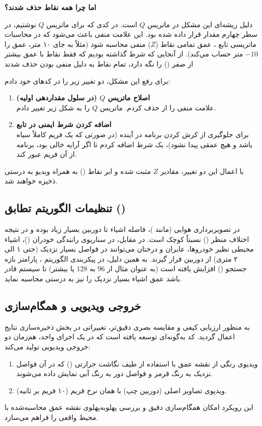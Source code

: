 \documentclass[12pt,a4paper]{article}
\begin{document}
	\textbf{اما چرا همه نقاط حذف شدند؟}
	
	دلیل ریشه‌ای این مشکل در ماتریس $Q$ است. در کدی که برای ماتریس $Q$ نوشتیم، در سطر چهارم مقدار  قرار داده شده بود. این علامت منفی باعث می‌شود که در محاسبات ماتریسی تابع ، عمق تمامی نقاط ($Z$) منفی محاسبه شود (مثلاً به جای ۱۰ متر، عمق را $-10$ متر حساب می‌کند). از آنجایی که شرط گذاشته بودیم که فقط نقاط با عمق بیشتر از صفر () را نگه دارد، تمام نقاط به دلیل منفی بودن حذف شدند
	
	برای رفع این مشکل، دو تغییر زیر را در کدهای خود دادم:
	
	\begin{enumerate}
		\item \textbf{اصلاح ماتریس $Q$ (در سلول مقداردهی اولیه)}\\
		علامت منفی را از  حذف کردم. ماتریس $Q$ را به شکل زیر تغییر دادم.
		
		\item \textbf{اضافه کردن شرط ایمنی در تابع }\\
		برای جلوگیری از کرش کردن برنامه در آینده (در صورتی که یک فریم کاملاً سیاه باشد و هیچ عمقی پیدا نشود)، یک شرط  اضافه کردم تا اگر آرایه خالی بود، برنامه از آن فریم عبور کند.
	\end{enumerate}
	
	با اعمال این دو تغییر، مقادیر $Z$ مثبت شده و ابر نقاط () به همراه ویدیو به درستی ذخیره خواهند شد.
\subsection{تنظیمات الگوریتم تطابق ()}	در تصویربرداری هوایی (مانند )، فاصله اشیاء تا دوربین بسیار زیاد بوده و در نتیجه اختلاف منظر () نسبتاً کوچک است. در مقابل، در سناریوی رانندگی خودران ()، اشیاء محیطی نظیر خودروها، عابران و درختان می‌توانند در فواصل بسیار نزدیک (حتی ۱ الی ۲ متری) از دوربین قرار گیرند. به همین دلیل، در پیکربندی الگوریتم ، پارامتر بازه جستجو () افزایش یافته است (به عنوان مثال از $96$ به $128$ یا بیشتر) تا سیستم قادر باشد عمق اشیاء بسیار نزدیک را نیز به درستی محاسبه نماید.
	
\subsection{خروجی ویدیویی و همگام‌سازی}	به منظور ارزیابی کیفی و مقایسه بصری دقیق‌تر، تغییراتی در بخش ذخیره‌سازی نتایج اعمال گردید. کد به‌گونه‌ای توسعه یافته است که در یک اجرای واحد، هم‌زمان دو خروجی ویدیویی تولید می‌کند: 
	\begin{enumerate}
	\item ویدیوی رنگی از نقشه عمق با استفاده از طیف نگاشت حرارتی () که در آن فواصل نزدیک به رنگ قرمز و فواصل دور به رنگ آبی نمایش داده می‌شوند.
	\item ویدیوی تصاویر اصلی (دوربین چپ) با همان نرخ فریم (۱۰ فریم بر ثانیه).
\end{enumerate}	این رویکرد امکان همگام‌سازی دقیق و بررسی پهلو‌به‌پهلوی نقشه عمق محاسبه‌شده با محیط واقعی را فراهم می‌سازد.
		
\end{document}
